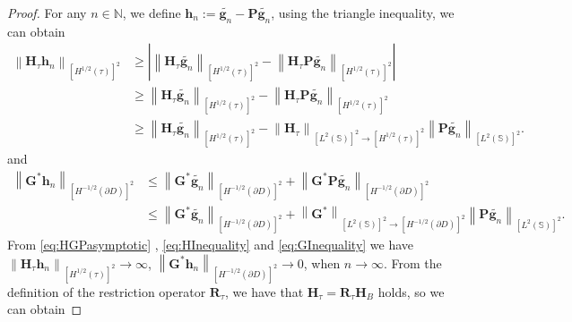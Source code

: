 \documentclass[10pt,a4paper]{amsart}
\begin{document}
\begin{proof}
For any $n\in \mathbb N$, we define $\mathbf h_n:= \tilde{\mathbf g_n} - \mathbf P \tilde{\mathbf g_n}$, using the triangle inequality, we can obtain
\begin{equation}\begin{aligned}\label{eq:HInequality}
	    \left\| \mathbf H_{\tau} \mathbf h_n \right\|_{\left[H^{1/2}\left(\tau \right) \right]^2 }
		&\geq \left| \left\| \mathbf H_{\tau} \tilde{\mathbf g_n} \right\|_{\left[H^{1/2}\left(\tau \right) \right]^2 } - \left\| \mathbf H_{\tau} \mathbf P \tilde{\mathbf g_n} \right\|_{\left[H^{1/2}\left(\tau \right) \right]^2 } \right |\\
		&\geq \left\| \mathbf H_{\tau} \tilde{\mathbf g_n} \right\|_{\left[H^{1/2}\left(\tau \right) \right]^2 } - \left\| \mathbf H_{\tau} \mathbf P \tilde{\mathbf g_n} \right\|_{\left[H^{1/2}\left(\tau \right) \right]^2 }\\
		&\geq \left\| \mathbf H_{\tau} \tilde{\mathbf g_n} \right\|_{\left[H^{1/2}\left(\tau \right) \right]^2 } - \left\| \mathbf H_{\tau} \right\|_{ \left[L^{2}\left(\mathbb S \right) \right]^2 \to \left[H^{1/2} \left(\tau \right) \right] ^2 } \left\|\mathbf P \tilde{\mathbf g_n} \right\|_{\left[L^{2} \left(\mathbb S \right) \right] ^2}.
\end{aligned}\end{equation}
and
\begin{equation}\begin{aligned}\label{eq:GInequality}
		\left\| \mathbf G^* \mathbf h_n \right\|_{\left[H^{-1/2}\left(\partial D \right) \right]^2 }
		&\leq \left\| \mathbf G^* \tilde{\mathbf g_n }\right\|_{\left[H^{-1/2}\left(\partial D \right) \right]^2 }+ \left\| \mathbf G^* \mathbf P \tilde{\mathbf g_n }\right\|_{\left[H^{-1/2}\left(\partial D \right) \right]^2 } \\
		&\leq \left\| \mathbf G^* \tilde{\mathbf g_n }\right\|_{\left[H^{-1/2}\left(\partial D \right) \right]^2 }+ \left\| \mathbf G^*\right\|_{\left[L^{2} \left(\mathbb S \right) \right] ^2 \to \left[H^{-1/2}\left(\partial D \right) \right]^2} \left\|\mathbf P \tilde{\mathbf g_n }\right\|_{\left[L^{2} \left(\mathbb S \right) \right] ^2}.
\end{aligned}\end{equation}
From \eqref{eq:HGPasymptotic} , \eqref{eq:HInequality} and  \eqref{eq:GInequality} we have $ \left\| \mathbf H_{\tau} \mathbf h_n \right\|_{\left[H^{1/2}\left(\tau \right) \right]^2 } \to \infty $, $\left\| \mathbf G^* \mathbf h_n \right\|_{\left[H^{-1/2}\left(\partial D \right) \right]^2 } \to 0$, when $n \to \infty$. From the definition of the restriction operator $\mathbf R_{\tau}$, we have that $\mathbf H_{\tau}= \mathbf R_{\tau} \mathbf H_{B} $ holds, so we can obtain

\end{proof}
\end{document}
